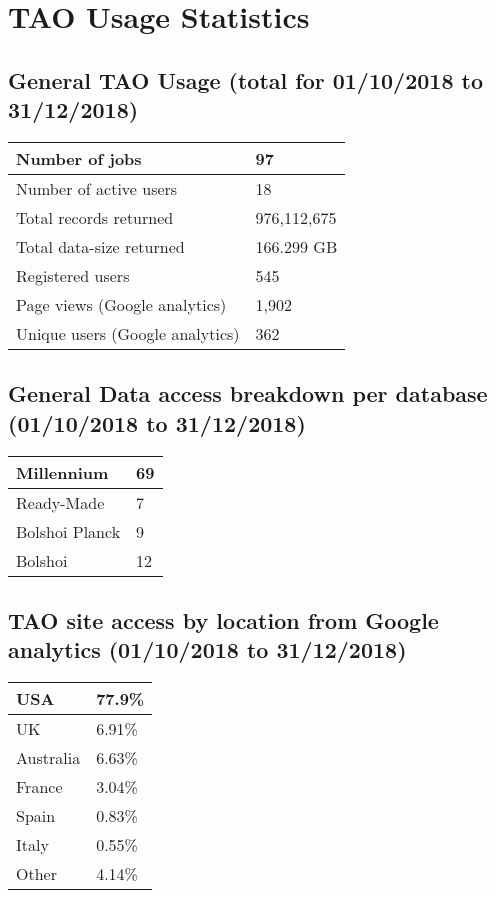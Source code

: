 \documentclass{article}%
\begin{document}
\section{TAO Usage Statistics}%

%
\subsection{General TAO Usage (total for 01/10/2018 to 31/12/2018)}%

%
\begin{longtabu}{X[l] X[l]}%
Number of jobs&97\\%
\hline%
Number of active users&18\\%
\hline%
Total records returned&976,112,675\\%
\hline%
Total data{-}size returned&166.299 GB\\%
\hline%
Registered users&545\\%
\hline%
Page views (Google analytics)&1,902\\%
\hline%
Unique users (Google analytics)&362\\%
\hline%
\end{longtabu}%
\subsection{General Data access breakdown per database (01/10/2018 to 31/12/2018)}%

%
\begin{longtabu}{X[l] X[l]}%
Millennium&69\\%
\hline%
Ready{-}Made&7\\%
\hline%
Bolshoi Planck&9\\%
\hline%
Bolshoi&12\\%
\hline%
\end{longtabu}%
\subsection{TAO site access by location from Google analytics (01/10/2018 to 31/12/2018)}%

%
\begin{longtabu}{X[l] X[l]}%
USA&77.9\%\\%
\hline%
UK&6.91\%\\%
\hline%
Australia&6.63\%\\%
\hline%
France&3.04\%\\%
\hline%
Spain&0.83\%\\%
\hline%
Italy&0.55\%\\%
\hline%
Other&4.14\%\\%
\hline%
\end{longtabu}%
\end{document}
